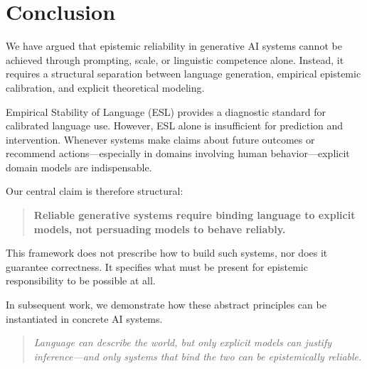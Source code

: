 \documentclass[11pt,a4paper]{article}
\begin{document}
\section{Conclusion}

We have argued that epistemic reliability in generative AI systems cannot be achieved through prompting, scale, or linguistic competence alone. Instead, it requires a structural separation between language generation, empirical epistemic calibration, and explicit theoretical modeling.

Empirical Stability of Language (ESL) provides a diagnostic standard for calibrated language use. However, ESL alone is insufficient for prediction and intervention. Whenever systems make claims about future outcomes or recommend actions---especially in domains involving human behavior---explicit domain models are indispensable.

Our central claim is therefore structural:

\begin{quote}
\textbf{Reliable generative systems require binding language to explicit models, not persuading models to behave reliably.}
\end{quote}

This framework does not prescribe how to build such systems, nor does it guarantee correctness. It specifies what must be present for epistemic responsibility to be possible at all.

In subsequent work, we demonstrate how these abstract principles can be instantiated in concrete AI systems.

\begin{quote}
\textit{Language can describe the world, but only explicit models can justify inference---and only systems that bind the two can be epistemically reliable.}
\end{quote}









\end{document}

